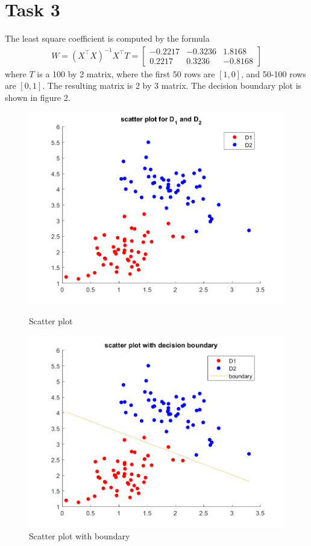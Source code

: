 \documentclass[11pt]{article}
\theoremstyle{plain}
\theoremstyle{definition}
\begin{document}
\section{Task 3}
The least square coefficient is computed by the formula \begin{align*}
W = (X^\top X)^{-1} X^\top T = \begin{bmatrix}
-0.2217 & -0.3236 & 1.8168 \\
0.2217 & 0.3236 & -0.8168
\end{bmatrix}
\end{align*}
where $T$ is a 100 by 2 matrix, where the first 50 rows are $[1,0]$, and 50-100 rows are $[0,1]$. The resulting matrix is 2 by 3 matrix. 
The decision boundary plot is shown in figure 2. 
\begin{figure}[!htb]
   \begin{minipage}{0.48\textwidth}
     \centering
     \includegraphics[width=.7\linewidth]{Task2.png}
     \caption{Scatter plot}\label{Fig:Original image}
   \end{minipage}\hfill
   \begin {minipage}{0.48\textwidth}
     \centering
     \includegraphics[width=.7\linewidth]{Task3.png}
     \caption{Scatter plot with boundary}\label{Fig:Rotate 90 degrees}
   \end{minipage}\hfill 
\end{figure} 
\end{document}
